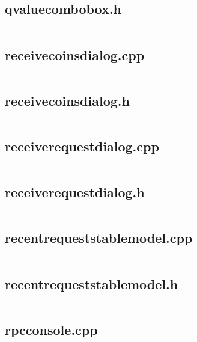\documentclass{article}
\begin{document}
\subsection{qvaluecombobox.h}
\inputminted{cpp}{/home/dufferzafar/dev/@clones/bitcoin/src/qt/qvaluecombobox.h}
\newpage

\subsection{receivecoinsdialog.cpp}
\inputminted{cpp}{/home/dufferzafar/dev/@clones/bitcoin/src/qt/receivecoinsdialog.cpp}
\newpage

\subsection{receivecoinsdialog.h}
\inputminted{cpp}{/home/dufferzafar/dev/@clones/bitcoin/src/qt/receivecoinsdialog.h}
\newpage

\subsection{receiverequestdialog.cpp}
\inputminted{cpp}{/home/dufferzafar/dev/@clones/bitcoin/src/qt/receiverequestdialog.cpp}
\newpage

\subsection{receiverequestdialog.h}
\inputminted{cpp}{/home/dufferzafar/dev/@clones/bitcoin/src/qt/receiverequestdialog.h}
\newpage

\subsection{recentrequeststablemodel.cpp}
\inputminted{cpp}{/home/dufferzafar/dev/@clones/bitcoin/src/qt/recentrequeststablemodel.cpp}
\newpage

\subsection{recentrequeststablemodel.h}
\inputminted{cpp}{/home/dufferzafar/dev/@clones/bitcoin/src/qt/recentrequeststablemodel.h}
\newpage

\subsection{rpcconsole.cpp}
\inputminted{cpp}{/home/dufferzafar/dev/@clones/bitcoin/src/qt/rpcconsole.cpp}
\newpage
\end{document}
